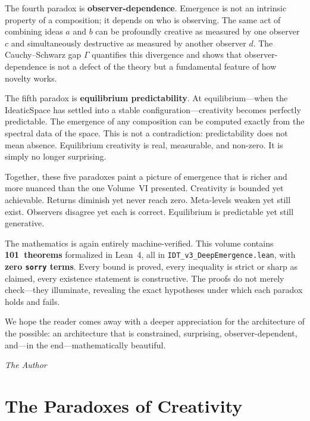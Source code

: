 \documentclass[11pt,oneside]{book}
\theoremstyle{definition}
\theoremstyle{plain}
\theoremstyle{remark}
\newcommand{\csgap}{\Gamma}                        %
\begin{document}
The fourth paradox is \textbf{observer-dependence}. Emergence is not an
intrinsic property of a composition; it depends on who is observing. The same
act of combining ideas $a$ and $b$ can be profoundly creative as measured by
one observer $c$ and simultaneously destructive as measured by another observer
$d$. The Cauchy--Schwarz gap $\csgap$ quantifies this divergence and shows
that observer-dependence is not a defect of the theory but a fundamental
feature of how novelty works.

The fifth paradox is \textbf{equilibrium predictability}. At equilibrium---when
the IdeaticSpace has settled into a stable configuration---creativity becomes
perfectly predictable. The emergence of any composition can be computed exactly
from the spectral data of the space. This is not a contradiction: predictability
does not mean absence. Equilibrium creativity is real, measurable, and
non-zero. It is simply no longer surprising.

Together, these five paradoxes paint a picture of emergence that is richer and
more nuanced than the one Volume~VI presented. Creativity is bounded yet
achievable. Returns diminish yet never reach zero. Meta-levels weaken yet still
exist. Observers disagree yet each is correct. Equilibrium is predictable yet
still generative.

The mathematics is again entirely machine-verified. This volume contains
\textbf{101~theorems} formalized in Lean~4, all in
\texttt{IDT\_v3\_DeepEmergence.lean}, with \textbf{zero \texttt{sorry} terms}.
Every bound is proved, every inequality is strict or sharp as claimed, every
existence statement is constructive. The proofs do not merely check---they
illuminate, revealing the exact hypotheses under which each paradox holds and
fails.

We hope the reader comes away with a deeper appreciation for the architecture of
the possible: an architecture that is constrained, surprising, observer-dependent,
and---in the end---mathematically beautiful.

\vspace{1em}
\hfill\textit{The Author}

\tableofcontents

\mainmatter

\part{The Paradoxes of Creativity}
\end{document}
